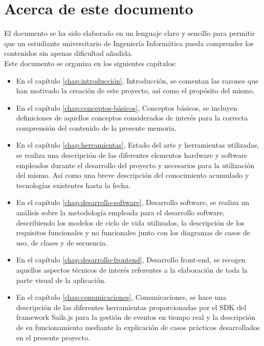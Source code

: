 \section{Acerca de este documento}

El documento se ha sido elaborado en un lenguaje claro y sencillo para permitir que un estudiante universitario de Ingeniería Informática pueda comprender los contenidos sin apenas dificultad añadida.\\

Este documento se organiza en los siguientes capítulos:\\

\begin{itemize}

\item En el capítulo \ref{chap:introducción}, Introducción, se comentan las razones que han motivado la creación de este proyecto, así como el propósito del mismo.

\item En el capítulo \ref{chap:conceptos-básicos}, Conceptos básicos, se incluyen definiciones de aquellos conceptos considerados de interés para la correcta comprensión del contenido de la presente memoria.

\item En el capítulo \ref{chap:herramientas}, Estado del arte y herramientas utilizadas, se realiza una descripción de las diferentes elementos hardware y software empleados durante el desarrollo del proyecto y necesarios para la utilización del mismo. Así como una breve descripción del conocimiento acumulado y tecnologías existentes hasta la fecha.

\item En el capítulo \ref{chap:desarrollo-software}, Desarrollo software, se realiza un análisis sobre la metodología empleada para el desarrollo software, describiendo los modelos de ciclo de vida utilizados, la descripción de los requisitos funcionales y no funcionales junto con los diagramas de casos de uso, de clases y de secuencia.

\item En el capítulo \ref{chap:desarrollo-frontend}, Desarrollo front-end, se recogen aquellos aspectos técnicos de interés referentes a la elaboración de toda la parte visual de la aplicación.

\item En el capítulo \ref{chap:comunicaciones}, Comunicaciones, se hace una descripción de las diferentes herramientas proporcionadas por el SDK del framework Sails.js para la gestión de eventos en tiempo real y la descripción de su funcionamiento mediante la explicación de casos prácticos desarrollados en el presente proyecto.


\end{itemize}
